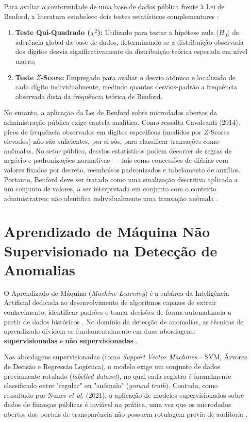 \documentclass[
    12pt,               %
    openright,          %
    oneside,            %
    a4paper,            %
    chapter=TITLE,      %
    sumario=tradicional,%
    english,            %
    brazilian,          %
 ]{abntex2}
\begin{document}
Para avaliar a conformidade de uma base de dados pública frente à Lei de Benford, a literatura estabelece dois testes estatísticos complementares \cite{nigrini2012, pereira2025}:
\begin{enumerate}
    \item \textbf{Teste Qui-Quadrado ($\chi^2$):} Utilizado para testar a hipótese nula ($H_0$) de aderência global da base de dados, determinando se a distribuição observada dos dígitos desvia significativamente da distribuição teórica esperada em nível macro;
    \item \textbf{Teste $Z$-Score:} Empregado para avaliar o desvio atômico e localizado de cada dígito individualmente, medindo quantos desvios-padrão a frequência observada dista da frequência teórica de Benford.
\end{enumerate}

No entanto, a aplicação da Lei de Benford sobre microdados abertos da administração pública exige cautela analítica. Como ressalta Cavalcanti (2014), picos de frequência observados em dígitos específicos (medidos por $Z$-Scores elevados) não são suficientes, por si sós, para classificar transações como anômalas. No setor público, desvios estatísticos podem decorrer de regras de negócio e padronizações normativas — tais como concessões de diárias com valores fixados por decreto, reembolsos padronizados e tabelamento de auxílios. Portanto, Benford deve ser tratado como uma sinalização descritiva aplicada a um conjunto de valores, a ser interpretada em conjunto com o contexto administrativo; não identifica individualmente uma transação anômala \cite{cavalcanti2014, nunes2021}.

\section{Aprendizado de Máquina Não Supervisionado na Detecção de Anomalias}\label{sec:aprendizado_nao_supervisionado}

O Aprendizado de Máquina (\textit{Machine Learning}) é a subárea da Inteligência Artificial dedicada ao desenvolvimento de algoritmos capazes de extrair conhecimento, identificar padrões e tomar decisões de forma automatizada a partir de dados históricos \cite{goldschmidt2005}. No domínio da detecção de anomalias, as técnicas de aprendizado dividem-se fundamentalmente em duas abordagens: \textbf{supervisionadas} e \textbf{não supervisionadas} \cite{nunes2021}.

Nas abordagens supervisionadas (como \textit{Support Vector Machines} -- SVM, Árvores de Decisão e Regressão Logística), o modelo exige um conjunto de dados previamente rotulado (\textit{labelled dataset}), no qual cada registro é formalmente classificado entre "regular" ou "anômalo" (\textit{ground truth}). Contudo, como ressaltado por Nunes \textit{et al.} (2021), a aplicação de modelos supervisionados sobre dados de finanças públicas é inviável na prática, uma vez que os microdados abertos dos portais de transparência não possuem rotulagem prévia de auditoria \cite{nunes2021}.
\end{document}
